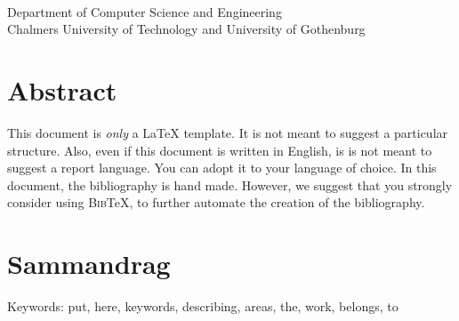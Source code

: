 \oneLineTitle\\
\oneLineSubtitle\\
\MEMBERTILDELIST\\

Department of Computer Science and Engineering\\
Chalmers University of Technology and University of Gothenburg\setlength{\parskip}{0.5cm}

\thispagestyle{plain} 
\setlength{\parskip}{0pt plus 1.0pt}
\section*{Abstract}

This document is \emph{only} a \LaTeX{} template. It is not meant to suggest a particular structure. Also, even if this document is written in English, is is not meant to suggest a report language. You can adopt it to your language of choice. In this document, the bibliography is hand made. However, we suggest that you strongly consider using \textsc{Bib}\TeX{}, to further automate the creation of the bibliography.

\section*{Sammandrag}

\vfill
Keywords: put, here, keywords, describing, areas, the, work, belongs, to

\newpage
\thispagestyle{empty}
\mbox{}